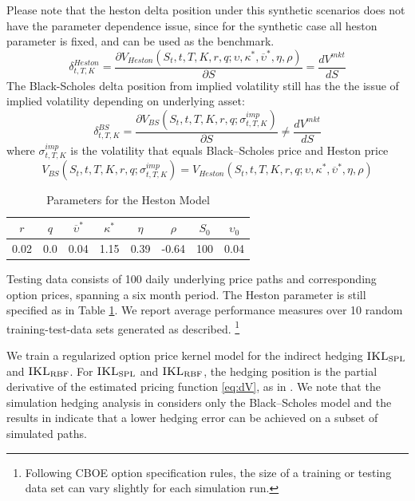 \documentclass[letterpaper,12pt,titlepage,oneside,final]{book}
\numberwithin{equation}{section}
\theoremstyle{definition}
\newcommand{\Vmkt}{V^{mkt}}
\newcommand{\IKLs}{\bf\textsc{IKL}_{\text{SPL}}}
\newcommand{\IKLg}{\bf\textsc{IKL}_{\text{RBF}}}
\begin{document}
 Please note that the heston delta position under this synthetic scenarios does not have the parameter dependence issue, since for the synthetic case all heston parameter is fixed, and can be used as the benchmark.
 \[
	 \delta^{Heston}_{t,T,K}=\frac{ \partial V_{Heston}(S_t,t,T,K,r,q;\upsilon,\kappa^*,\overline{\upsilon}^*,\eta,\rho)}{\partial S}=\frac{d \Vmkt}{d S}
 \] 
 The Black-Scholes delta position from implied volatility still has the the issue of implied volatility depending on underlying asset:
 \[
	 \delta^{BS}_{t,T,K}=\frac{ \partial V_{BS}(S_t,t,T,K,r,q;\sigma^{imp}_{t,T,K})}{\partial S} \neq \frac{d \Vmkt}{d S}
 \] 
 where $\sigma^{imp}_{t,T,K}$ is the volatility that equals Black–Scholes price and Heston price
 \[
	 V_{BS}(S_t,t,T,K,r,q;\sigma^{imp}_{t,T,K})=V_{Heston}(S_t,t,T,K,r,q;\upsilon,\kappa^*,\overline{\upsilon}^*,\eta,\rho)
 \]

 \begin{table}[htp!]
\begin{center}
\begin{tabular}{|c|c|c|c|c|c|c|c|}
\hline
 $r$ &$q$& $\overline{\upsilon}^*$  & $\kappa^*$ & $\eta$ & $\rho$ & $S_0$ & $\upsilon_0$  \\ \hline
 0.02&0.0&0.04                  & 1.15   & 0.39  & -0.64 & 100 &0.04 \\    \hline
\end{tabular}
\end{center}

\caption{Parameters for the Heston Model}
\label{para}
\end{table}



Testing data consists of 100 daily underlying price paths and corresponding option prices, spanning a six month period. The Heston parameter is still specified as in Table \ref{para}. We report average performance measures over 10 random training-test-data sets generated as described. \footnote{Following CBOE option specification rules, the size of a training or testing data set can vary slightly for each simulation run.}



We train a regularized option price kernel model for the indirect hedging $\IKLs$ and $\IKLg$. For $\IKLs$ and $\IKLg$,
the hedging position is  the partial derivative of the estimated pricing function  \eqref{eq:dV},  as in \citep{hutchinson}. We note that the simulation hedging analysis in \cite{hutchinson} considers only the Black–Scholes model and the results in \citep{hutchinson} indicate that a lower hedging error can be achieved on a subset of simulated paths.
\end{document}
